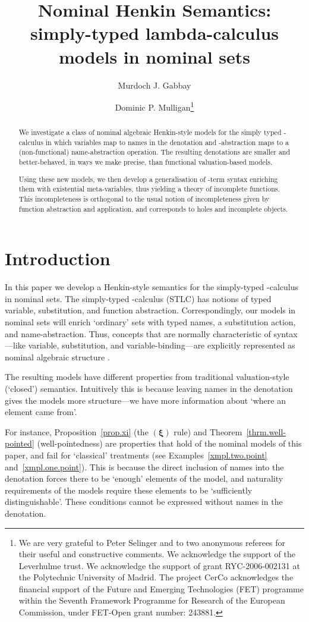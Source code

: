 \documentclass[submission,copyright]{eptcs}
\title{Nominal Henkin Semantics: simply-typed lambda-calculus models in nominal sets}
\date{}
\author{Murdoch J. Gabbay
\and
Dominic P. Mulligan\thanks{\tiny 
We are very grateful to Peter Selinger and to two anonymous referees for their useful and constructive comments.
We acknowledge the support of the Leverhulme trust.
We acknowledge the support of grant RYC-2006-002131 at the Polytechnic University of Madrid. 
The project CerCo acknowledges the financial support of the Future and Emerging Technologies (FET) programme within the Seventh Framework Programme for Research of the European Commission, under FET-Open grant number: 243881.  
}}
\newcommand{\rulefont}[1]{\ensuremath{(\mathbf{#1})}}
\begin{document}
\maketitle
\begin{abstract}
We investigate a class of nominal algebraic Henkin-style models for the simply typed -calculus in which variables map to names in the denotation and -abstraction maps to a (non-functional) name-abstraction operation.
The resulting denotations are smaller and better-behaved, in ways we make precise, than functional valuation-based models.

Using these new models, we then develop a generalisation of -term syntax enriching them with existential meta-variables, thus yielding a theory of incomplete functions.
This incompleteness is orthogonal to the usual notion of incompleteness given by function abstraction and application, and corresponds to holes and incomplete objects. 
\end{abstract}




\section{Introduction}
\label{sect.introduction}

In this paper we develop a Henkin-style semantics for the simply-typed -calculus in nominal sets.
The simply-typed -calculus (STLC) has notions of typed variable, substitution, and function abstraction.
Correspondingly, our models in nominal sets will enrich `ordinary' sets with typed names, a substitution action, and name-abstraction.
Thus, concepts that are normally characteristic of syntax---like variable, substitution, and variable-binding---are explicitly represented as nominal algebraic structure \cite{gabbay:nomuae}.

The resulting models have different properties from traditional valuation-style (`closed') semantics.
Intuitively this is because leaving names in the denotation gives the models more structure---we have more information about `where an element came from'.

For instance, Proposition~\ref{prop.xi} (the \rulefont{\xi} rule) and Theorem~\ref{thrm.well-pointed} (well-pointedness) are properties that hold of the nominal models of this paper, and fail for `classical' treatments (see Examples~\ref{xmpl.two.point} and~\ref{xmpl.one.point}). 
This is because the direct inclusion of names into the denotation forces there to be `enough' elements of the model, and naturality requirements of the models require these elements to be `sufficiently distinguishable'.
These conditions cannot be expressed without names in the denotation.
\end{document}

